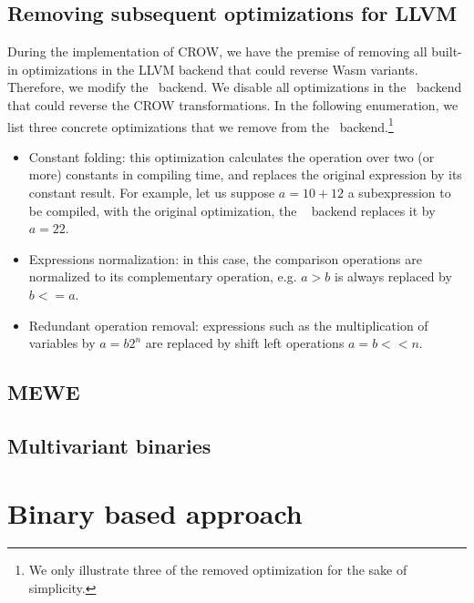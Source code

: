 \subsection{Removing subsequent optimizations for LLVM}

During the implementation of CROW, we have the premise of removing all built-in optimizations in the LLVM backend that could reverse Wasm variants.
Therefore, we modify the \wasm\ backend.
We disable all optimizations in the \wasm\ backend that could reverse the CROW transformations.
In the following enumeration, we list three concrete optimizations that we remove from the \wasm~backend.\footnote{
We only illustrate three of the removed optimization for the sake of simplicity.}

\begin{itemize}
    \item Constant folding: this optimization calculates the operation over two (or more) constants in compiling time, and replaces the original expression by its constant result. For example, let us suppose \texttt{$a = 10 + 12$} a subexpression to be compiled, with the original optimization, the \wasm~ backend replaces it by \texttt{$a = 22$}.
    
    \item Expressions normalization: in this case, the comparison operations are normalized to its complementary operation, e.g. \texttt{$a > b$} is always replaced by \texttt{$b <= a$}.
    
    \item Redundant operation removal: expressions such as the multiplication of variables by \texttt{$a = b2^n$} are replaced by shift left operations \texttt{$a = b << n$}.  
\end{itemize}



\subsection{MEWE}

\subsection{Multivariant binaries}

\section{Binary based approach}


